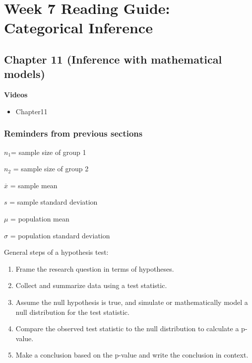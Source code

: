 \documentclass[
]{report}
\providecommand{\tightlist}{%
  \setlength{\itemsep}{0pt}\setlength{\parskip}{0pt}}
\begin{document}
\hypertarget{week-7-reading-guide-categorical-inference}{%
\section{Week 7 Reading Guide: Categorical Inference}\label{week-7-reading-guide-categorical-inference}}

\hypertarget{chapter-11-inference-with-mathematical-models}{%
\subsection*{Chapter 11 (Inference with mathematical models)}\label{chapter-11-inference-with-mathematical-models}}


\textbf{Videos}

\begin{itemize}
\tightlist
\item
  Chapter11
\end{itemize}


\hypertarget{reminders-from-previous-sections-4}{%
\subsubsection*{Reminders from previous sections}\label{reminders-from-previous-sections-4}}

\(n_1\)= sample size of group 1

\(n_2\) = sample size of group 2

\(\overline{x}\) = sample mean

\(s\) = sample standard deviation

\(\mu\) = population mean

\(\sigma\) = population standard deviation

General steps of a hypothesis test:

\begin{enumerate}
\def\labelenumi{\arabic{enumi}.}
\item
  Frame the research question in terms of hypotheses.
\item
  Collect and summarize data using a test statistic.
\item
  Assume the null hypothesis is true, and simulate or mathematically model a null distribution for the test statistic.
\item
  Compare the observed test statistic to the null distribution to calculate a p-value.
\item
  Make a conclusion based on the p-value and write the conclusion in context.
\end{enumerate}
\end{document}
